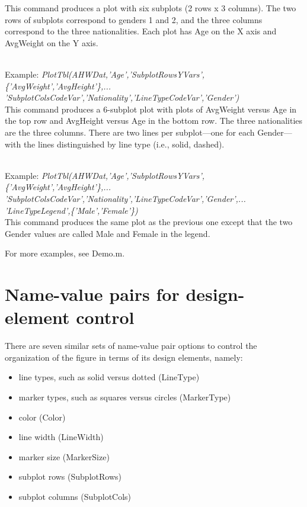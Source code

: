\documentclass{article}
\newcommand{\example}[1]{\mbox{ } \\ Example: {\it #1} \\ }
\begin{document}
This command produces a plot with six subplots (2 rows x 3 columns).
The two rows of subplots correspond to genders 1 and 2,
and the three columns correspond to the three nationalities.
Each plot has Age on the X axis and AvgWeight on the Y axis.

\example{PlotTbl(AHWDat,'Age','SubplotRowsYVars',\{'AvgWeight','AvgHeight'\},... \\
'SubplotColsCodeVar','Nationality','LineTypeCodeVar','Gender')}

This command produces a 6-subplot plot with plots of AvgWeight versus Age in the top row and
AvgHeight versus Age in the bottom row.  The three nationalities are the three columns.
There are two lines per subplot---one for each Gender---with the lines distinguished by
line type (i.e., solid, dashed).

\example{PlotTbl(AHWDat,'Age','SubplotRowsYVars',\{'AvgWeight','AvgHeight'\},... \\
'SubplotColsCodeVar','Nationality','LineTypeCodeVar','Gender',... \\
'LineTypeLegend',\{'Male','Female'\})}

This command produces the same plot as the previous one except that the two Gender values are called Male and Female in the legend.

For more examples, see Demo.m.

\section{Name-value pairs for design-element control}

There are seven similar sets of name-value pair options to control the organization of
the figure in terms of its design elements, namely:
\begin{itemize}
\item line types, such as solid versus dotted (LineType)
\item marker types, such as squares versus circles (MarkerType)
\item color (Color)
\item line width (LineWidth)
\item marker size (MarkerSize)
\item subplot rows (SubplotRows)
\item subplot columns (SubplotCols)
\end{itemize}

\end{document}
